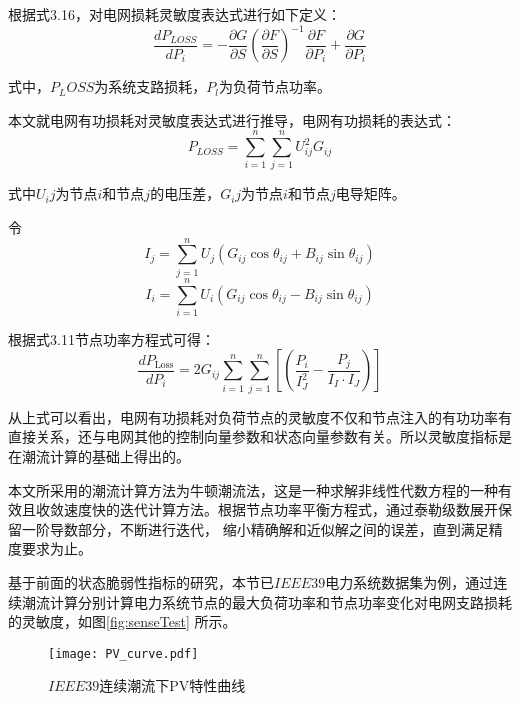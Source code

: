 根据式3.16，对电网损耗灵敏度表达式进行如下定义：
\begin{equation}
  \frac{d P_{LOSS}}{d P_i}=-\frac{\partial G}{\partial S}\left(\frac{\partial F}{\partial S}\right)^{-1} \frac{\partial F}{\partial P_i}+\frac{\partial G}{\partial P_i}
  \end{equation}

式中，$P_LOSS$为系统支路损耗，$P_l$为负荷节点功率。

本文就电网有功损耗对灵敏度表达式进行推导，电网有功损耗的表达式：
\begin{equation}
  P_{L O S S}=\sum_{i=1}^{n} \sum_{j=1}^{n} U_{i j}^{2} G_{i j}
  \end{equation}

式中$U_ij$为节点$i$和节点$j$的电压差，$G_ij$为节点$i$和节点$j$电导矩阵。

令$$I_j = \sum_{j=1}^{n} U_{j}\left(G_{i j} \cos \theta_{i j}+B_{i j} \sin \theta_{i j}\right)$$
$$I_i = \sum_{i=1}^{n} U_{i}\left(G_{i j} \cos \theta_{i j}-B_{i j} \sin \theta_{i j}\right)$$

根据式3.11节点功率方程式可得：
\begin{equation}
  \frac{d P_{\text {Loss}}}{d P_{i}}=2 G_{i j} \sum_{i=1}^{n} \sum_{j=1}^{n}\left[\left(\frac{P_{i}}{I_{J}^{2}}-\frac{P_{j}}{I_{I} \cdot I_{J}}\right)\right]
  \end{equation}

从上式可以看出，电网有功损耗对负荷节点的灵敏度不仅和节点注入的有功功率有直接关系，还与电网其他的控制向量参数和状态向量参数有关。所以灵敏度指标是在潮流计算的基础上得出的。

本文所采用的潮流计算方法为牛顿潮流法，这是一种求解非线性代数方程的一种有效且收敛速度快的迭代计算方法。根据节点功率平衡方程式，通过泰勒级数展开保留一阶导数部分，不断进行迭代，
缩小精确解和近似解之间的误差，直到满足精度要求为止。



基于前面的状态脆弱性指标的研究，本节已$IEEE39$电力系统数据集为例，通过连续潮流计算分别计算电力系统节点的最大负荷功率和节点功率变化对电网支路损耗的灵敏度，如图\ref{fig:senseTest}
所示。
\begin{figure}[H] 
  \centering
  \texttt{[image: PV\_curve.pdf]}
  \caption{$IEEE39$连续潮流下PV特性曲线}
  \label{fig:PV_curve}
\end{figure}

